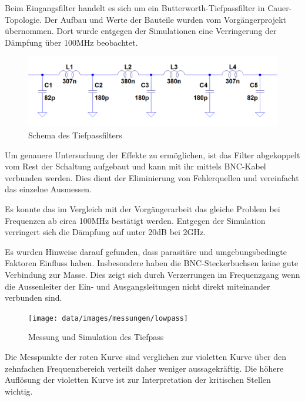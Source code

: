 Beim Eingangsfilter handelt es sich um ein Butterworth-Tiefpassfilter in Cauer-Topologie. Der Aufbau und Werte der Bauteile wurden vom Vorgängerprojekt übernommen. Dort wurde entgegen der Simulationen eine Verringerung der Dämpfung über 100MHz beobachtet.

\begin{figure}[H]
	\begin{center}
		\includegraphics[clip,scale=0.4]{data/images/lowpass}
		\caption{Schema des Tiefpassfilters}
		\label{fig:lowpass}
	\end{center}
\end{figure}

Um genauere Untersuchung der Effekte zu ermöglichen, ist das Filter abgekoppelt vom Rest der Schaltung aufgebaut und kann mit ihr mittels BNC-Kabel verbunden werden. Dies dient der Eliminierung von Fehlerquellen und vereinfacht das einzelne Ausmessen.

Es konnte das im Vergleich mit der Vorgängerarbeit das gleiche Problem bei Frequenzen ab circa 100MHz bestätigt werden. Entgegen der Simulation verringert sich die Dämpfung auf unter 20dB bei 2GHz.

Es wurden Hinweise darauf gefunden, dass parasitäre und umgebungsbedingte Faktoren Einfluss haben. Insbesondere haben die BNC-Steckerbuchsen keine gute Verbindung zur Masse. Dies zeigt sich durch Verzerrungen im Frequenzgang wenn die Aussenleiter der Ein- und Ausgangsleitungen nicht direkt miteinander verbunden sind.

\begin{figure}[H]
	\begin{center}
		\texttt{[image: data/images/messungen/lowpass]}
		\caption{Messung und Simulation des Tiefpass}
		\label{fig:lowpass-plot}
	\end{center}
\end{figure}

Die Messpunkte der roten Kurve sind verglichen zur violetten Kurve über den zehnfachen Frequenzbereich verteilt daher weniger aussagekräftig. Die höhere Auflösung der violetten Kurve ist zur Interpretation der kritischen Stellen wichtig.
